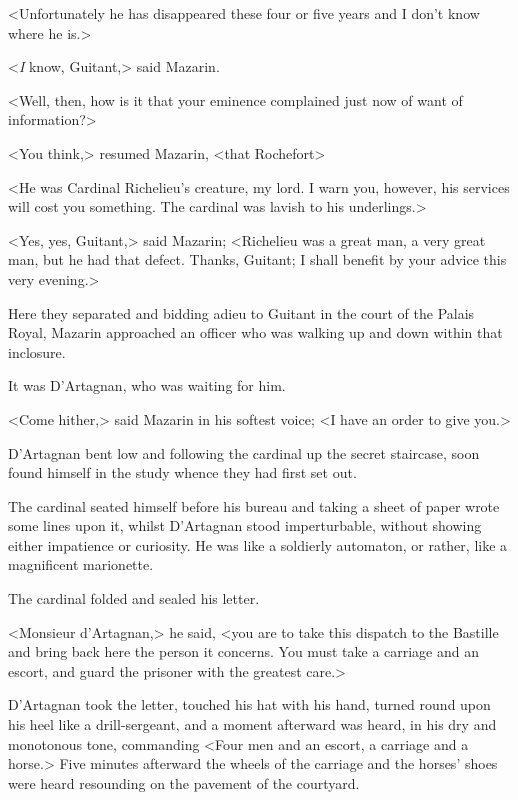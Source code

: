 <Unfortunately he has disappeared these four or five years and I don't know where he is.>

<\emph{I} know, Guitant,> said Mazarin.

<Well, then, how is it that your eminence complained just now of want of information?>

<You think,> resumed Mazarin, <that Rochefort\longdash>

<He was Cardinal Richelieu's creature, my lord. I warn you, however, his services will cost you something. The cardinal was lavish to his underlings.>

<Yes, yes, Guitant,> said Mazarin; <Richelieu was a great man, a very great man, but he had that defect. Thanks, Guitant; I shall benefit by your advice this very evening.>

Here they separated and bidding adieu to Guitant in the court of the Palais Royal, Mazarin approached an officer who was walking up and down within that inclosure.

It was D'Artagnan, who was waiting for him.

<Come hither,> said Mazarin in his softest voice; <I have an order to give you.>

D'Artagnan bent low and following the cardinal up the secret staircase, soon found himself in the study whence they had first set out.

The cardinal seated himself before his bureau and taking a sheet of paper wrote some lines upon it, whilst D'Artagnan stood imperturbable, without showing either impatience or curiosity. He was like a soldierly automaton, or rather, like a magnificent marionette.

The cardinal folded and sealed his letter.

<Monsieur d'Artagnan,> he said, <you are to take this dispatch to the Bastille and bring back here the person it concerns. You must take a carriage and an escort, and guard the prisoner with the greatest care.>

D'Artagnan took the letter, touched his hat with his hand, turned round upon his heel like a drill-sergeant, and a moment afterward was heard, in his dry and monotonous tone, commanding <Four men and an escort, a carriage and a horse.> Five minutes afterward the wheels of the carriage and the horses' shoes were heard resounding on the pavement of the courtyard. 